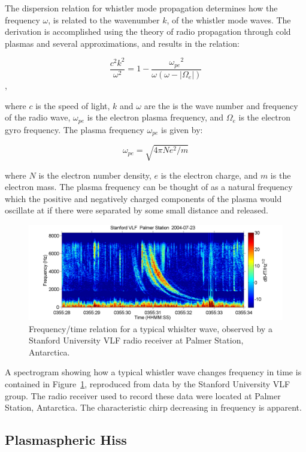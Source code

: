 The dispersion relation for whistler mode propagation determines how the frequency $\omega$, is related to the wavenumber $k$, of the whistler mode waves. The derivation is accomplished using the theory of radio propagation through cold plasmas and several approximations, and results in the relation:

$$\frac{c^2k^2}{\omega^2} = 1 - \frac{{\omega_{pe}}^2}{\omega(\omega - |\Omega_e|)}$$,

where $c$ is the speed of light, $k$ and $\omega$ are the is the wave number and frequency of the radio wave, $\omega_{pe}$ is the electron plasma frequency, and $\Omega_e$ is the electron gyro frequency. The plasma frequency $\omega_{pe}$ is given by:

$$\omega_{pe} = \sqrt{4\pi N e^2/m}$$

where $N$ is the electron number density, $e$ is the electron charge, and $m$ is the electron mass. The plasma frequency can be thought of as a natural frequency which the positive and negatively charged components of the plasma would oscillate at if there were separated by some small distance and released. 

\begin{figure}[p]
\label{whistler_spectrogram}
\centering
\includegraphics[width=1.0\textwidth,angle=0]{figures/chapter_2/whistler/Whistler_radio_palmer_2004-07-23_T035528.png}
\caption{Frequency/time relation for a typical whislter wave, observed by a Stanford University VLF radio receiver at Palmer Station, Antarctica.}
\end{figure}

A spectrogram showing how a typical whistler wave changes frequency in time is contained in Figure~\ref{whistler_spectrogram}, reproduced from data by the Stanford University VLF group. The radio receiver used to record these data were located at Palmer Station, Antarctica. The characteristic chirp decreasing in frequency is apparent. 

\subsection{Plasmaspheric Hiss}

